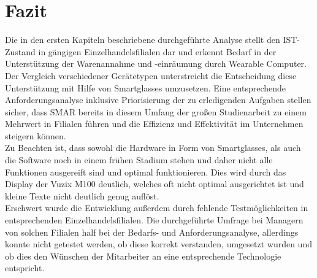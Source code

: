 
\chapter{Fazit}
Die in den ersten Kapiteln beschriebene durchgeführte Analyse stellt den IST-Zustand in gängigen Einzelhandelsfilialen dar und erkennt Bedarf in der Unterstützung der Warenannahme und -einräumung durch Wearable Computer. Der Vergleich verschiedener Gerätetypen unterstreicht die Entscheidung diese Unterstützung mit Hilfe von Smartglasses umzusetzen. Eine entsprechende Anforderungsanalyse inklusive Priorisierung der zu erledigenden Aufgaben stellen sicher, dass \ac{SMAR} bereits in diesem Umfang der großen Studienarbeit zu einem Mehrwert in Filialen führen und die Effizienz und Effektivität im Unternehmen steigern können.\\

Zu Beachten ist, dass sowohl die Hardware in Form von Smartglasses, als auch die Software noch in einem frühen Stadium stehen und daher nicht alle Funktionen ausgereift sind und optimal funktionieren. Dies wird \zB durch das Display der Vuzix M100 deutlich, welches oft nicht optimal ausgerichtet ist und kleine Texte nicht deutlich genug auflöst.\\

Erschwert wurde die Entwicklung außerdem durch fehlende Testmöglichkeiten in entsprechenden Einzelhandelsfilialen. Die durchgeführte Umfrage bei Managern von solchen Filialen half bei der Bedarfs- und Anforderungsanalyse, allerdings konnte nicht getestet werden, ob diese korrekt verstanden, umgesetzt wurden und ob dies den Wünschen der Mitarbeiter an eine entsprechende Technologie entspricht.\\

